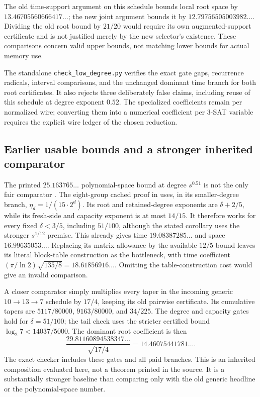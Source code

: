 The old time-support argument on this schedule bounds local root space by
$13.46705560666417\ldots$; the new joint argument bounds it by
$12.79756505003982\ldots$. Dividing the old root bound by $21/20$ would
require its own augmented-support certificate and is not justified merely
by the new selector's existence. These comparisons concern valid upper
bounds, not matching lower bounds for actual memory use.

The standalone \texttt{check\_low\_degree.py} verifies the exact gate gaps,
recurrence radicals, interval comparisons, and the unchanged dominant time
branch for both root certificates. It also rejects three deliberately
false claims, including reuse of this schedule at degree exponent $0.52$.
The specialized coefficients remain per normalized wire; converting them
into a numerical coefficient per 3-SAT variable requires the explicit wire
ledger of the chosen reduction.

\subsection{Earlier usable bounds and a stronger inherited comparator}

The printed $25.163765\ldots$ polynomial-space bound at degree $s^{0.51}$
is not the only fair comparator \cite{exactkernels}. The eight-group cached
proof in \cite{cacheeight} uses, in its smaller-degree branch,
$\eta_d=1/(15\cdot2^d)$. Its root and retained-degree exponents are
$\delta+2/5$, while its fresh-side and capacity exponent is at most $14/15$.
It therefore works for every fixed $\delta<3/5$, including $51/100$,
although the stated corollary uses the stronger $s^{1/12}$ premise.
This already gives time $19.08387285\ldots$ and space $16.99635053\ldots$.
Replacing its matrix allowance by the available $12/5$ bound leaves its
literal block-table construction as the bottleneck, with time coefficient
$(\pi/\ln2)\sqrt{135/8}=18.61856916\ldots$.
Omitting the table-construction cost would give an invalid comparison.

A closer comparator simply multiplies every taper in the incoming generic
$10\to13\to7$ schedule by $17/4$, keeping its old pairwise certificate.
Its cumulative tapers are $5117/80000$, $9163/80000$, and $34/225$.
The degree and capacity gates hold for $\delta=51/100$; the tail check uses
the stricter certified bound $\log_2 7<14037/5000$.
The dominant root coefficient is then
\[
 \frac{29.81160894538347\ldots}{\sqrt{17/4}}
 =14.46075441781\ldots.
\]
The exact checker includes these gates and all paid branches. This is an
inherited composition evaluated here, not a theorem printed in the source.
It is a substantially stronger baseline than comparing only with the old
generic headline or the polynomial-space number.

